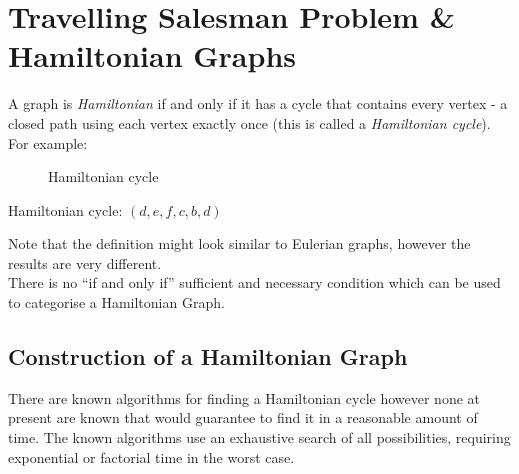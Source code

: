 \section{Travelling Salesman Problem \& Hamiltonian Graphs}
A graph is \textit{Hamiltonian} if and only if it has a cycle that contains every vertex - a closed path using each vertex exactly once (this is called a \textit{Hamiltonian cycle}). For example:

\begin{minipage}{0.5\textwidth}
    \begin{figure}[H]
        \centering
        \caption{Hamiltonian cycle}
    \end{figure}
\end{minipage} \hfill
\begin{minipage}{0.45\textwidth}
Hamiltonian cycle: $(d, e, f, c, b, d)$
\end{minipage} \vspace{0.5em}

Note that the definition might look similar to Eulerian graphs, however the results are very different.\\

There is no ``if and only if'' sufficient and necessary condition which can be used to categorise a Hamiltonian Graph.

\subsection{Construction of a Hamiltonian Graph}
There are known algorithms for finding a Hamiltonian cycle however none at present are known that would guarantee to find it in a reasonable amount of time. The known algorithms use an exhaustive search of all possibilities, requiring exponential or factorial time in the worst case. 

